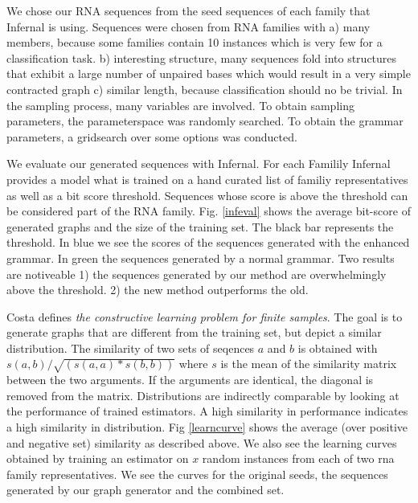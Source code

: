 \documentclass{article}
\begin{document}
We chose our RNA sequences from the seed sequences of each family
that Infernal is using\cite{rfam}. Sequences were chosen from RNA families with
a) many members, because some families contain 10
instances which is very few for a classification task. b) interesting 
structure, many sequences fold into structures that exhibit a large number of 
unpaired bases which would result in a very simple contracted graph
c) similar length, because classification should no be trivial.
In the sampling process, many variables are involved. To obtain 
sampling parameters, the parameterspace was randomly searched.
To obtain the grammar parameters, a gridsearch over some options was conducted.



We evaluate our generated sequences with Infernal\cite{infernal}.
For each Familily Infernal provides a model what is trained on 
a hand curated list of familiy representatives as well as a 
bit score threshold. Sequences whose score is above the threshold 
can be considered part of the RNA family. 
Fig. \ref{infeval} shows the average bit-score of generated graphs
and the size of the training set. The black bar represents the threshold.
In blue we see the scores of the sequences generated with the enhanced grammar.
In green the sequences generated by a normal grammar. 
Two results are notiveable 1) the sequences generated by our method
are overwhelmingly above the threshold. 2) the new method outperforms
the old. 

Costa \cite{costa14} defines \emph{the constructive learning problem for 
finite samples}.
The goal is to generate graphs that are different from the training set,
but depict a similar distribution.
The similarity of two sets of seqences $a$ and $b$ 
is obtained with $s(a,b)/\sqrt{(s(a,a)*s(b,b))}$ where $s$ is the mean of the
similarity matrix between the two arguments. If the arguments are identical,
the diagonal is removed from the matrix.
Distributions are indirectly comparable by looking at the performance 
of trained estimators. A high similarity in performance indicates a high
similarity in distribution.
Fig \ref{learncurve} shows the average (over positive and negative set)
similarity as described above. 
We also see the learning curves obtained by training an estimator
on $x$ random instances from each of two rna family representatives.
We see the curves for the original seeds, the sequences generated by 
our graph generator and the combined set. 
\end{document}
